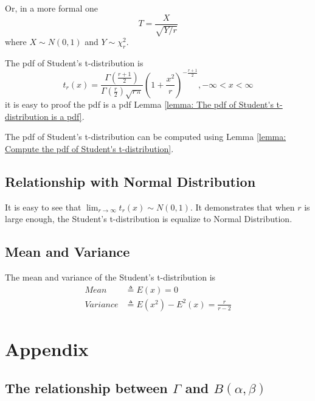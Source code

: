 \documentclass[a4paper]{article}
\begin{document}
Or, in a more formal one
\begin{equation}
    T = \frac{X}{\sqrt{Y/r}}
\end{equation}
where $X \sim N(0, 1)$ and $Y \sim \chi_r^2$.

The pdf of Student's t-distribution is
\begin{equation}
    t_r(x) = \frac{\Gamma(\frac{r+1}{2})}{\Gamma(\frac{r}{2}) \sqrt{r\pi}} (1+\frac{x^2}{r})^{-\frac{r+1}{2}}, -\infty < x < \infty
\end{equation}
it is easy to proof the pdf is a pdf Lemma \ref{lemma: The pdf of Student's t-distribution is a pdf}.

The pdf of Student's t-distribution can be computed using Lemma \ref{lemma: Compute the pdf of Student's t-distribution}.

\subsection{Relationship with Normal Distribution}

It is easy to see that $\lim_{r \to \infty} t_r(x) \sim N(0, 1)$.
It demonstrates that when $r$ is large enough, the Student's t-distribution is equalize to Normal Distribution.

\subsection{Mean and Variance}

The mean and variance of the Student's t-distribution is
\begin{equation*}
    \begin{aligned}
        Mean     & \triangleq E(x) = 0                        \\
        Variance & \triangleq E(x^2) - E^2(x) = \frac{r}{r-2}
    \end{aligned}
\end{equation*}

\newpage

\appendix

\section{Appendix}

\subsection{The relationship between $\Gamma$ and $B(\alpha, \beta)$}
\end{document}
